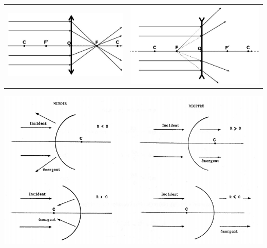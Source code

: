 \documentclass[letterpaper,8pt]{extarticle}
\begin{document}
\begin{multicols*}{3}


\begin{tabular}{lc}
\begin{minipage}[t]{0.15\textwidth}
    \vspace{-2.2cm}
    \includegraphics[scale=0.25]{images/lentilles_convergent.jpeg}
\end{minipage} &
    \includegraphics[scale=0.25]{images/lentilles_divergentes.jpeg}
\end{tabular}

\includegraphics[scale=0.25]{images/miroirs_dioptres.png}


\end{multicols*}
\end{document}
